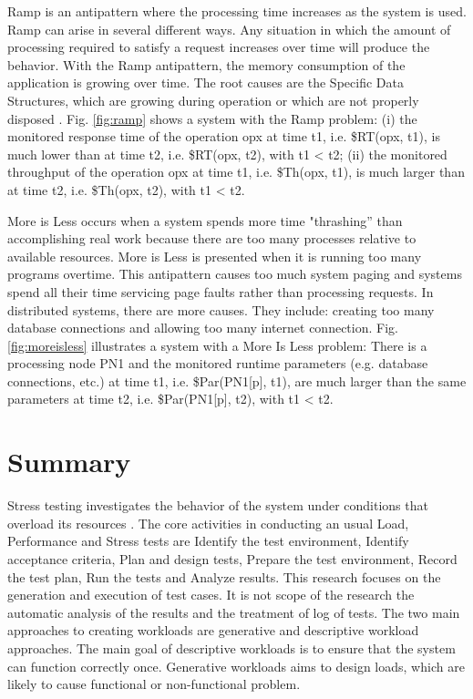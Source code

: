 \documentclass[espaco=umemeio,chapter=TITLE,twoside,openright]{abnt}
\begin{document}
Ramp is an antipattern where the processing time increases as the system is used. Ramp can arise in several different ways. Any situation in which the amount of processing required to satisfy a request increases over time will produce the behavior. With the Ramp antipattern, the memory consumption of the application is growing over time. The root causes are the Specific Data Structures, which are growing during operation or which are not properly disposed \cite{Wert2014} \cite{Smith2003}. Fig. \ref{fig:ramp} shows a system  with the Ramp problem:  (i) the monitored response time of the operation opx at time t1, i.e. \$RT(opx, t1), is much lower than at time t2, i.e. \$RT(opx, t2), with t1 < t2; (ii) the monitored throughput of the operation opx at time t1, i.e. \$Th(opx, t1), is much larger than at time t2, i.e. \$Th(opx, t2), with t1 < t2.

More is Less occurs when a system spends more time "thrashing” than accomplishing real work because there are too many processes relative to available resources. More is Less is presented when it is running too many programs overtime. This antipattern causes too much system paging and systems spend all their time servicing page faults rather than processing requests. In distributed systems, there are more causes. They include: creating too many database connections and  allowing too many internet connection. Fig. \ref{fig:moreisless} illustrates a system  with a More Is Less problem: There is a processing node PN1 and the monitored runtime parameters (e.g. database connections, etc.) at time t1, i.e. \$Par(PN1[p], t1), are much larger than the same parameters at time t2, i.e. \$Par(PN1[p], t2), with t1 < t2.

\section{Summary}

Stress testing investigates the behavior of the system under conditions
that overload its resources \cite{Sandler2004} \cite{Lewis2005}. The core activities in conducting an usual Load, Performance and Stress tests are  Identify the test environment, Identify acceptance criteria, Plan and design tests, Prepare the test environment, Record the test plan, Run the tests and Analyze results. This research focuses on the generation and execution of test cases. It is not scope of the research the automatic analysis of the results and the treatment of log of tests. The two main approaches to creating workloads are generative and descriptive workload approaches. The main goal of descriptive workloads is to ensure that the system can function correctly once. Generative workloads  aims to design loads, which are likely to cause functional or non-functional problem. 
\end{document}
